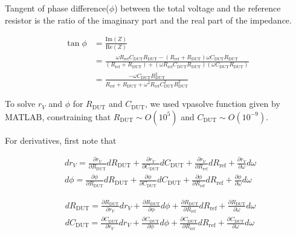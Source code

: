 \documentclass[%
 aip,
 amsmath,amssymb,
 reprint,%
]{revtex4-1}
\begin{document}
\noindent Tangent of phase difference($\phi$) between the total voltage and the reference resistor is the ratio of the imaginary part and the real part of the impedance.

\begin{align*}
\tan\phi&=\frac{\textrm{Im}(Z)}{\textrm{Re}(Z)}\\
&=\frac{\omega R_{\textrm{ref}} C_{\textrm{DUT}}R_{\textrm{DUT}}-(R_{\textrm{ref}}+R_{\textrm{DUT}})\omega C_{\textrm{DUT}}R_{\textrm{DUT}}}{(R_{\textrm{ref}}+R_{\textrm{DUT}})+(\omega R_{\textrm{ref}} C_{\textrm{DUT}}R_{\textrm{DUT}})(\omega C_{\textrm{DUT}}R_{\textrm{DUT}})}\\
&=\frac{-\omega C_{\textrm{DUT}}R_{\textrm{DUT}}^{2}}{R_{\textrm{ref}}+R_{\textrm{DUT}}+\omega^{2} R_{\textrm{ref}}C_{\textrm{DUT}}^{2}R_{\textrm{DUT}}^{2}}
\end{align*}

\noindent To solve $r_{V}$ and $\phi$ for $R_{\textrm{DUT}}$ and $C_{\textrm{DUT}}$, we used vpasolve function given by MATLAB, constraining that $R_{\textrm{DUT}}\sim O(10^{5})$ and $C_{\textrm{DUT}}\sim O(10^{-9})$.

For derivatives, first note that

\begin{align}
&dr_{V}=\frac{\partial r_{V}}{\partial R_{\textrm{DUT}}}dR_{\textrm{DUT}}+\frac{\partial r_{V}}{\partial C_{\textrm{DUT}}}dC_{\textrm{DUT}}+\frac{\partial r_{V}}{\partial R_{\textrm{ref}}}dR_{\textrm{ref}}+\frac{\partial r_{V}}{\partial \omega}d\omega\\
&d\phi=\frac{\partial \phi}{\partial R_{\textrm{DUT}}}dR_{\textrm{DUT}}+\frac{\partial \phi}{\partial C_{\textrm{DUT}}}dC_{\textrm{DUT}}+\frac{\partial \phi}{\partial R_{\textrm{ref}}}dR_{\textrm{ref}}+\frac{\partial \phi}{\partial \omega}d\omega
\end{align}

\begin{align}
&dR_{\textrm{DUT}}=\frac{\partial R_{\textrm{DUT}}}{\partial r_{V}}dr_{V}+\frac{\partial R_{\textrm{DUT}}}{\partial \phi}d\phi+\frac{\partial R_{\textrm{DUT}}}{\partial R_{\textrm{ref}}}dR_{\textrm{ref}}+\frac{\partial R_{\textrm{DUT}}}{\partial \omega}d\omega\label{eq:rdut}\\
&dC_{\textrm{DUT}}=\frac{\partial C_{\textrm{DUT}}}{\partial r_{V}}dr_{V}+\frac{\partial C_{\textrm{DUT}}}{\partial \phi}d\phi+\frac{\partial C_{\textrm{DUT}}}{\partial R_{\textrm{ref}}}dR_{\textrm{ref}}+\frac{\partial C_{\textrm{DUT}}}{\partial \omega}d\omega
\label{eq:cdut}
\end{align}
\end{document}
